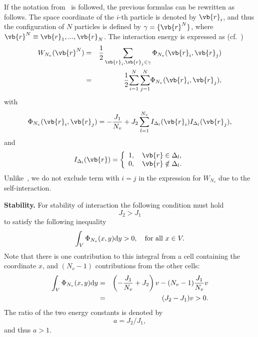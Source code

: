 \begin{mdframed}[linecolor=black,linewidth=1pt,leftline=true]
	If the notation from~\cite{HansenMcDonald13} is followed, the previous formulas can be rewritten as follows. The space coordinate of the $i$-th particle is denoted by $\vb{r}_i$, and thus the configuration of $N$ particles is defined by $\gamma = \{\vb{r}^N\}$, where $\vb{r}^N \equiv \vb{r}_1, ..., \vb{r}_N$. The interaction energy is expressed as (cf.~\cite[eq.~(2.5.16)]{HansenMcDonald13})
	\begin{eqnarray*}
		W_{N_v}(\vb{r}^N) & = & \frac{1}{2} \sum_{\vb{r}_i,\vb{r}_j \in \gamma} \Phi_{N_v} (\vb{r}_i,\vb{r}_j)
		\\
		& = & \frac12 {\sum_{i=1}^N \sum_{j=1}^N} \Phi_{N_v} (\vb{r}_i,\vb{r}_j),
	\end{eqnarray*}
	with
	\begin{equation*}
		\Phi_{N_v}(\vb{r}_i, \vb{r}_j) = -\frac{J_1}{N_v} + J_2\sum_{l=1}^{N_v} I_{\Delta_l}(\vb{r}_i) I_{\Delta_l}(\vb{r}_j),
	\end{equation*}
	and
	\begin{equation*}
		I_{\Delta_l} (\vb{r}) = \left\{
		\begin{array}{ll}
			1, \quad \vb{r} \in \Delta_l,
			\\
			0, \quad \vb{r} \notin \Delta_l.
		\end{array}
		\right.
	\end{equation*}
	Unlike~\cite[eq.~(2.5.16)]{HansenMcDonald13}, we do not exclude term with $i = j$ in the expression for $W_{N_v}$ due to the self-interaction.
\end{mdframed}


	\textbf{Stability.} For stability of interaction the following condition must hold
\begin{equation*}
	J_2 > J_1
\end{equation*}
to satisfy the following inequality~\cite{KKD20,Ruelle70}
\begin{equation}
	\int_{V} \Phi_{N_v}(x,y) {\rm d}y > 0, \quad \text{for all } x \in V.
\end{equation}
Note that there is one contribution to this integral from a cell containing the coordinate $x$, and $(N_v - 1)$ contributions from the other cells:
\begin{eqnarray*}
	\int_{V} \Phi_{N_v}(x,y) {\rm d}y & = & \left(-\frac{J_1}{N_v} + J_2\right)v - (N_v - 1) \frac{J_1}{N_v}v
	\\
	& = & (J_2 - J_1)v > 0.
\end{eqnarray*}
The ratio of the two energy constants is denoted by
$$a = J_2/J_1,$$
and thus $a > 1.$


